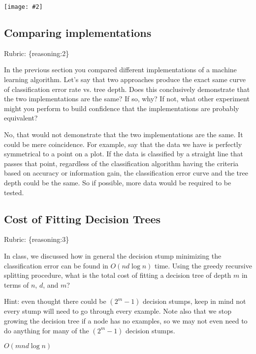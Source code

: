 \documentclass{article}
\def\rubric#1{\gre{Rubric: \{#1\}}}{}
\def\blu#1{{\color{blu}#1}}
\def\gre#1{{\color{gre}#1}}
\def\red#1{{\color{red}#1}}
\newcommand{\centerfig}[2]{\begin{center}\texttt{[image: \#2]}\end{center}}
\begin{document}
\centerfig{0.7}{./figs/q6_4_decisionBoundary}

\subsection{Comparing implementations}
\rubric{reasoning:2}

In the previous section you compared different implementations of a machine learning algorithm. Let's say that two
approaches produce the exact same curve of classification error rate vs. tree depth. Does this conclusively demonstrate
that the two implementations are the same? If so, why? If not, what other experiment might you perform to build confidence
that the implementations are probably equivalent?

\red{No, that would not demonstrate that the two implementations are the same. It could be mere coincidence. For example, say that the data we have is perfectly symmetrical to a point on a plot. If the data is classified by a straight line that passes that point, regardless of the classification algorithm having the criteria based on accuracy or information gain, the classification error curve and the tree depth could be the same. So if possible, more data would be required to be tested.}

\subsection{Cost of Fitting Decision Trees}
\rubric{reasoning:3}

In class, we discussed how in general the decision stump minimizing the classification error can be found in $O(nd\log n)$ time.
Using the greedy recursive splitting procedure, \blu{what is the total cost of fitting a decision tree of depth $m$ in terms of $n$, $d$, and $m$?}

Hint: even thought there could be $(2^m-1)$ decision stumps, keep in mind not every stump will need to go through every example. Note also that we stop growing the decision tree if a node has no examples, so we may not even need to do anything for many of the $(2^m-1)$ decision stumps.

\red{$O(mnd\log n)$}
\end{document}
